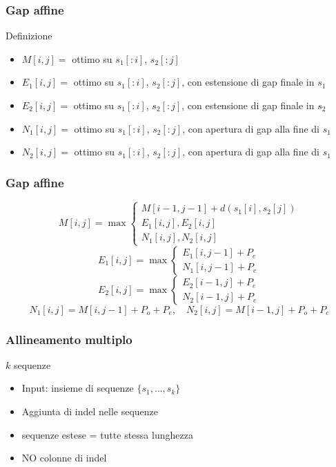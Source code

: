 \begin{frame}[fragile]
\frametitle{Gap affine}
\begin{block}{Definizione}
\begin{itemize}
\item
$M[i,j] = $ ottimo su $s_{1}[:i]$, $s_{2}[:j]$
\item
$E_{1}[i,j] = $ ottimo su $s_{1}[:i]$, $s_{2}[:j]$, con estensione di gap finale
in $s_{1}$
\item
$E_{2}[i,j] = $ ottimo su $s_{1}[:i]$, $s_{2}[:j]$, con estensione di gap finale
in $s_{2}$
\item
$N_{1}[i,j] = $ ottimo su $s_{1}[:i]$, $s_{2}[:j]$, con apertura di gap alla
fine di $s_{1}$
\item
$N_{2}[i,j] = $ ottimo su $s_{1}[:i]$, $s_{2}[:j]$, con apertura di gap alla
fine di $s_{1}$
\end{itemize}
\end{block}
\end{frame}

\begin{frame}[fragile]
\frametitle{Gap affine}
\begin{equation*}
M[i,j] = \max \left\{
\begin{array}{l}%
M[i-1, j-1] + d(s_{1}[i], s_{2}[j])\\
E_{1}[i,j],
E_{2}[i,j] \\
N_{1}[i,j],
N_{2}[i,j]
\end{array}
\right.
\end{equation*}
\begin{equation*}
E_{1}[i,j] = \max \left\{
\begin{array}{l}%
E_{1}[i,j-1] + P_{e}\\
N_{1}[i,j-1] + P_{e}
\end{array}
\right.
\end{equation*}
\begin{equation*}
E_{2}[i,j] = \max \left\{
\begin{array}{l}%
E_{2}[i-1,j] + P_{e} \\
N_{2}[i-1,j] + P_{e}
\end{array}
\right.
\end{equation*}
\begin{equation*}
N_{1}[i,j] = M[i,j-1] + P_{o} + P_{e}, \quad
N_{2}[i,j] = M[i-1,j] + P_{o} + P_{e}
\end{equation*}
\end{frame}

\begin{frame}[fragile]
\frametitle{Allineamento multiplo}
\begin{block}{$k$ sequenze}
\begin{itemize}[<+->]
\item
Input: insieme di sequenze $\{s_{1}, \ldots , s_{k}\}$
\item
Aggiunta di \alert{indel} nelle sequenze
\item
sequenze estese = tutte stessa lunghezza
\item
NO colonne di indel
\end{itemize}
\end{block}
\end{frame}


